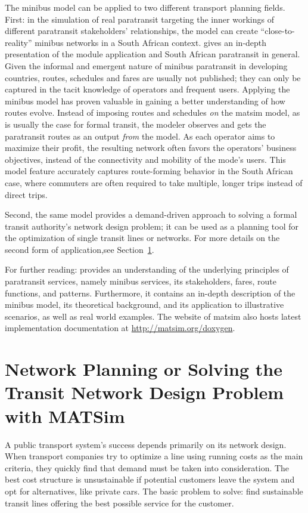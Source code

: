 The minibus model can be applied to two different transport planning fields. First: in the simulation of real paratransit targeting the inner workings of different paratransit stakeholders' relationships, the model can create ``close-to-reality'' minibus networks in a South African context. \citet[][]{NeumannEtAl2014MinibusRSA} gives an in-depth presentation of the module application and South African paratransit in general. Given the informal and emergent nature of minibus paratransit in developing countries, routes, schedules and fares are usually not published; they can only be captured in the tacit knowledge of operators and frequent users. Applying the minibus model has proven valuable in gaining a better understanding of how routes evolve. Instead of imposing routes and schedules \emph{on} the \gls{matsim} model, as is usually the case for formal transit, the modeler observes and gets the paratransit routes as an output \emph{from} the model. As each operator aims to maximize their profit, the resulting network often favors the operators' business objectives, instead of the connectivity and mobility of the mode's users. This model feature accurately captures route-forming behavior in the South African case, where commuters are often required to take multiple, longer trips instead of direct trips.

Second, the same model provides a demand-driven approach to solving a formal transit authority's network design problem; it can be used as a planning tool for the optimization of single transit lines or networks. For more details on the second form of application,see Section~\ref{sec:paratransit_application}.

For further reading: \citet[][]{Neumann2014PhD} provides an understanding of the underlying principles of paratransit services, namely minibus services, its stakeholders, fares, route functions, and patterns. Furthermore, it contains an in-depth description of the minibus model, its theoretical background, and its application to illustrative scenarios, as well as real world examples. The website of \gls{matsim} also hosts latest implementation documentation at \url{http://matsim.org/doxygen}.

\section{Network Planning or Solving the Transit Network Design Problem with MATSim}
\label{sec:paratransit_application}
%
A public transport system's success depends primarily on its network design. When transport companies try to optimize a line using running costs as the main criteria, they quickly find that demand must be taken into consideration. The best cost structure is unsustainable if potential customers leave the system and opt for alternatives, like private cars. The basic problem to solve: find sustainable transit lines offering the best possible service for the customer.


